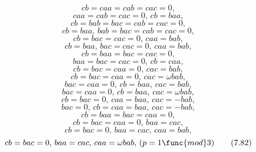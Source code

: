 \documentclass[10pt,thmsa]{article}
\begin{document}
\begin{equation}
cb=caa=cab=cac=0,  \tag{7.65}
\end{equation}%
\begin{equation}
caa=cab=cac=0,\,cb=baa,  \tag{7.66}
\end{equation}%
\begin{equation}
cb=bab=bac=cab=cac=0,  \tag{7.67}
\end{equation}%
\begin{equation}
cb=baa,\,bab=bac=cab=cac=0,  \tag{7.68}
\end{equation}%
\begin{equation}
cb=bac=cac=0,\,caa=bab,  \tag{7.69}
\end{equation}%
\begin{equation}
cb=baa,\,bac=cac=0,\,caa=bab,  \tag{7.70}
\end{equation}%
\begin{equation}
cb=baa=bac=cac=0,  \tag{7.71}
\end{equation}%
\begin{equation}
baa=bac=cac=0,\,cb=caa,  \tag{7.72}
\end{equation}%
\begin{equation}
cb=bac=caa=0,\,cac=bab,  \tag{7.73}
\end{equation}%
\begin{equation}
cb=bac=caa=0,\,cac=\omega bab,  \tag{7.74}
\end{equation}%
\begin{equation}
bac=caa=0,\,cb=baa,\,cac=bab,  \tag{7.75}
\end{equation}%
\begin{equation}
bac=caa=0,\,cb=baa,\,cac=\omega bab,  \tag{7.76}
\end{equation}%
\begin{equation}
cb=bac=0,\,caa=baa,\,cac=-bab,  \tag{7.77}
\end{equation}%
\begin{equation}
bac=0,\,cb=caa=baa,\,cac=-bab,  \tag{7.78}
\end{equation}%
\begin{equation}
cb=baa=bac=caa=0,  \tag{7.79}
\end{equation}%
\begin{equation}
cb=bac=caa=0,\,baa=cac,  \tag{7.80}
\end{equation}%
\begin{equation}
cb=bac=0,\,baa=cac,\,caa=bab,  \tag{7.81}
\end{equation}%
\begin{equation}
cb=bac=0,\,baa=cac,\,caa=\omega bab,\,(p=1\func{mod}3)  \tag{7.82}
\end{equation}%
\end{document}
